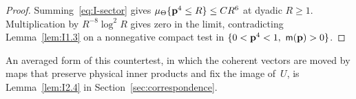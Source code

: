 \begin{proof}
Summing~\eqref{eq:I-sector} gives $\mu_{\Theta}\{\mathbf p^4\le R\}\le CR^6$ at dyadic $R\ge1$. Multiplication by $R^{-8}\log^2R$ gives zero in the limit, contradicting Lemma~\ref{lem:I1.3} on a nonnegative compact test in $\{0<\mathbf p^4<1,\ \mathsf{m}(\mathbf p)>0\}$.
\end{proof}

An averaged form of this countertest, in which the coherent vectors are moved by maps that preserve physical inner products and fix the image of~$U$, is Lemma~\ref{lem:I2.4} in Section~\ref{sec:correspondence}.

